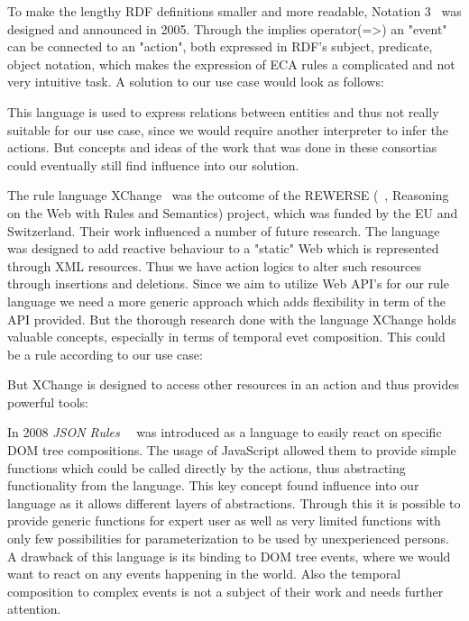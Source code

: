 To make the lengthy RDF definitions smaller and more readable, Notation 3~\cite{wwwn3} was designed and announced in 2005. Through the implies operator(=\textgreater) an "event" can be connected to an "action", both expressed in RDF's subject, predicate, object notation, which makes the expression of ECA rules a complicated and not very intuitive task. A solution to our use case would look as follows:

This language is used to express relations between entities and thus not really suitable for our use case, since we would require another interpreter to infer the actions. But concepts and ideas of the work that was done in these consortias could eventually still find influence into our solution.

The rule language XChange~\cite{2005-Patranjan-TLE.pdf} was the outcome of the REWERSE (~\cite{wwwRewerse}, Reasoning on the Web with Rules and Semantics) project, which was funded by the EU and Switzerland. Their work influenced a number of future research. The language was designed to add reactive behaviour to a "static" Web which is represented through XML resources. Thus we have action logics to alter such resources through insertions and deletions. Since we aim to utilize Web API's for our rule language we need a more generic approach which adds flexibility in term of the API provided. But the thorough research done with the language XChange holds valuable concepts, especially in terms of temporal evet composition. This could be a rule according to our use case:


But XChange is designed to access other resources in an action and thus provides powerful tools:

In 2008 \emph{JSON Rules}~~\cite{2008-Giurca_Pascalau-JSON_Rules.pdf} was introduced as a language to easily react on specific DOM tree compositions.
The usage of JavaScript allowed them to provide simple functions which could be called directly by the actions, thus abstracting functionality from the language.
This key concept found influence into our language as it allows different layers of abstractions.
Through this it is possible to provide generic functions for expert user as well as very limited functions with only few possibilities for parameterization to be used by unexperienced persons.
A drawback of this language is its binding to DOM tree events, where we would want to react on any events happening in the world.
Also the temporal composition to complex events is not a subject of their work and needs further attention.


